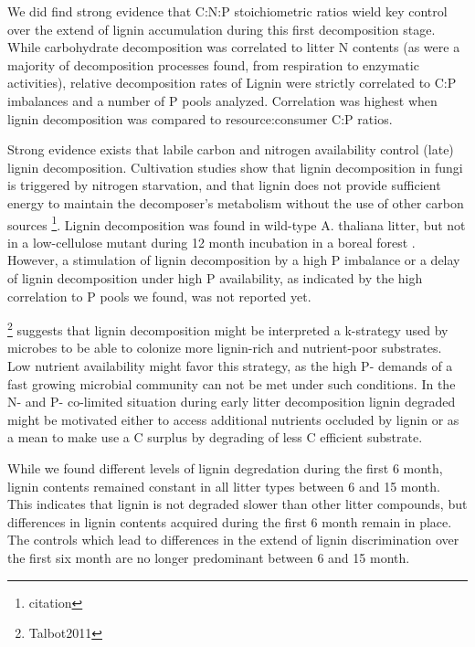 \documentclass[authoryear,preprint,review,12pt]{elsarticle}
\begin{document}
We did find strong evidence that C:N:P stoichiometric ratios wield key control over the extend of lignin accumulation during this first decomposition stage. While carbohydrate decomposition was correlated to litter N contents (as were a majority of decomposition processes found, from respiration to enzymatic activities), relative decomposition rates of Lignin were strictly correlated to C:P imbalances and a number of P pools analyzed. Correlation was highest when lignin decomposition was compared to resource:consumer C:P ratios.

Strong evidence exists that labile carbon and nitrogen availability control (late) lignin decomposition. Cultivation studies show that lignin decomposition in fungi is triggered by nitrogen starvation, and that lignin does not provide sufficient energy to maintain the decomposer's metabolism without the use of other carbon sources \footnote{citation}. Lignin decomposition was found in wild-type A. thaliana litter, but not in a low-cellulose mutant during 12 month incubation in a boreal forest \citep{Talbot2011}. However, a stimulation of lignin decomposition by a high P imbalance or a delay of lignin decomposition under high P availability, as indicated by the high correlation to P pools we found, was not reported yet. 

\cite{Talbot2011} \footnote{Talbot2011} suggests that lignin decomposition might be interpreted a k-strategy used by microbes to be able to colonize more lignin-rich and nutrient-poor substrates. Low nutrient availability might favor this strategy, as the high P- demands of a fast growing microbial community can not be met under such conditions. In the N- and P- co-limited situation during early litter decomposition lignin degraded might be motivated either to access additional nutrients occluded by lignin or as a mean to make use a C surplus by degrading of less C efficient substrate. 

While we found different levels of lignin degredation during the first 6 month, lignin contents remained constant in all litter types between 6 and 15 month. This indicates that lignin is not degraded slower than other litter compounds, but differences in lignin contents acquired during the first 6 month remain in place. The controls which lead to differences in the extend of lignin discrimination over the first six month are no longer predominant between 6 and 15 month. 
\end{document}
